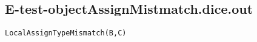 \subsection{E-test-objectAssignMistmatch.dice.out}
\begin{verbatim}
LocalAssignTypeMismatch(B,C)

\end{verbatim}
